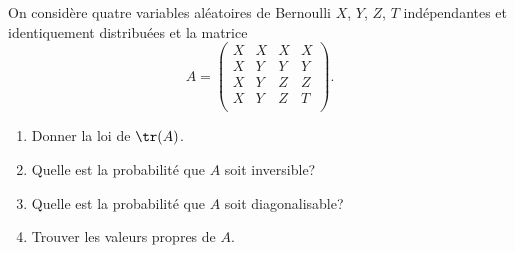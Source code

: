 \begin{enonce}
\begin{exercise}[ID={RMS130 E753},subtitle={Mines-Pont PSI 2019},tags={}]
On considère quatre variables aléatoires de Bernoulli $X$, $Y$, $Z$, $T$ indépendantes et identiquement distribuées et la matrice
\begin{equation*}
  A = 
  \begin{pmatrix}
    X&X&X&X\\
    X&Y&Y&Y\\
    X&Y&Z&Z\\
    X&Y&Z&T\\
  \end{pmatrix}.
\end{equation*}
\begin{enumerate}
  \item Donner la loi de $\tr(A)$.
  \item Quelle est la probabilité que $A$ soit inversible?
  \item Quelle est la probabilité que $A$ soit diagonalisable?
  \item Trouver les valeurs propres de $A$.
\end{enumerate}
\end{exercise}
\begin{solution}
\end{solution}
\end{enonce}
